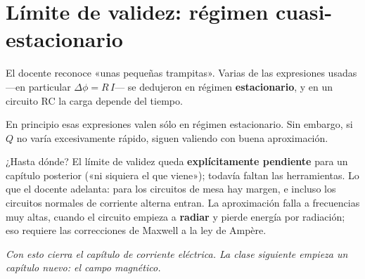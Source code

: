 \documentclass[12pt,a4paper]{article}
\begin{document}
\section{Límite de validez: régimen cuasi-estacionario}

El docente reconoce «unas pequeñas trampitas». Varias de las expresiones
usadas ---en particular $\Delta\phi = R\,I$--- se dedujeron en régimen
\textbf{estacionario}, y en un circuito RC la carga depende del tiempo.

\begin{notebox}[Observación]
En principio esas expresiones valen sólo en régimen
estacionario. Sin embargo, si $Q$ no varía excesivamente rápido, siguen
valiendo con buena aproximación.
\end{notebox}

¿Hasta dónde? El límite de validez queda \textbf{explícitamente pendiente} para un
capítulo posterior («ni siquiera el que viene»); todavía faltan las
herramientas. Lo que el docente adelanta: para los circuitos de mesa hay
margen, e incluso los circuitos normales de corriente alterna entran. La
aproximación falla a frecuencias muy altas, cuando el circuito empieza a
\textbf{radiar} y pierde energía por radiación; eso requiere las correcciones de
Maxwell a la ley de Ampère.

\noindent\emph{Con esto cierra el capítulo de corriente eléctrica. La clase siguiente
empieza un capítulo nuevo: el campo magnético.}
\end{document}
